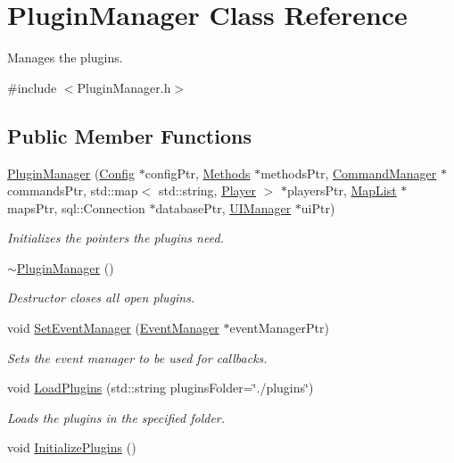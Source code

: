 \hypertarget{classPluginManager}{\section{Plugin\-Manager Class Reference}
\label{classPluginManager}
}


Manages the plugins.  




{\ttfamily \#include $<$Plugin\-Manager.\-h$>$}

\subsection*{Public Member Functions}
\begin{DoxyCompactItemize}
\item 
\hyperlink{classPluginManager_a562e6cac47bc8af1bf688cce814a8a27}{Plugin\-Manager} (\hyperlink{classConfig}{Config} $\ast$config\-Ptr, \hyperlink{classMethods}{Methods} $\ast$methods\-Ptr, \hyperlink{classCommandManager}{Command\-Manager} $\ast$commands\-Ptr, std\-::map$<$ std\-::string, \hyperlink{structPlayer}{Player} $>$ $\ast$players\-Ptr, \hyperlink{classMapList}{Map\-List} $\ast$maps\-Ptr, sql\-::\-Connection $\ast$database\-Ptr, \hyperlink{classUIManager}{U\-I\-Manager} $\ast$ui\-Ptr)
\begin{DoxyCompactList}\small\item\em Initializes the pointers the plugins need. \end{DoxyCompactList}\item 
\hypertarget{classPluginManager_ab657302ef5af357907ae11ad817f5dfc}{\hyperlink{classPluginManager_ab657302ef5af357907ae11ad817f5dfc}{$\sim$\-Plugin\-Manager} ()}\label{classPluginManager_ab657302ef5af357907ae11ad817f5dfc}

\begin{DoxyCompactList}\small\item\em Destructor closes all open plugins. \end{DoxyCompactList}\item 
void \hyperlink{classPluginManager_a7ed7485291babeed3109a1a364b6d308}{Set\-Event\-Manager} (\hyperlink{classEventManager}{Event\-Manager} $\ast$event\-Manager\-Ptr)
\begin{DoxyCompactList}\small\item\em Sets the event manager to be used for callbacks. \end{DoxyCompactList}\item 
void \hyperlink{classPluginManager_a0ff203ba125f85688fa752bf789418f0}{Load\-Plugins} (std\-::string plugins\-Folder=\char`\"{}./plugins\char`\"{})
\begin{DoxyCompactList}\small\item\em Loads the plugins in the specified folder. \end{DoxyCompactList}\item 
\hypertarget{classPluginManager_aba7e19d75b25ca1a91b92d95b173240f}{void \hyperlink{classPluginManager_aba7e19d75b25ca1a91b92d95b173240f}{Initialize\-Plugins} ()}\label{classPluginManager_aba7e19d75b25ca1a91b92d95b173240f}


\end{DoxyCompactItemize}
